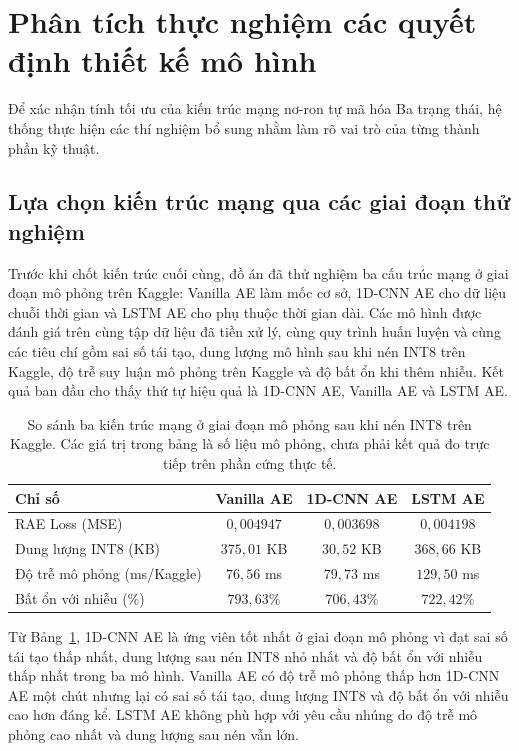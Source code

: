 \section{Phân tích thực nghiệm các quyết định thiết kế mô hình}
\label{sec:thuc_nghiem_thiet_ke}

Để xác nhận tính tối ưu của kiến trúc mạng nơ-ron tự mã hóa Ba trạng thái, hệ thống thực hiện các thí nghiệm bổ sung nhằm làm rõ vai trò của từng thành phần kỹ thuật.

\subsection{Lựa chọn kiến trúc mạng qua các giai đoạn thử nghiệm}

Trước khi chốt kiến trúc cuối cùng, đồ án đã thử nghiệm ba cấu trúc mạng ở giai đoạn mô phỏng trên Kaggle: Vanilla AE làm mốc cơ sở, 1D-CNN AE cho dữ liệu chuỗi thời gian và LSTM AE cho phụ thuộc thời gian dài. Các mô hình được đánh giá trên cùng tập dữ liệu đã tiền xử lý, cùng quy trình huấn luyện và cùng các tiêu chí gồm sai số tái tạo, dung lượng mô hình sau khi nén INT8 trên Kaggle, độ trễ suy luận mô phỏng trên Kaggle và độ bất ổn khi thêm nhiễu. Kết quả ban đầu cho thấy thứ tự hiệu quả là 1D-CNN AE, Vanilla AE và LSTM AE.

\begin{table}[H]
\centering
\caption[So sánh ba kiến trúc mạng sau nén INT8 trên Kaggle]{So sánh ba kiến trúc mạng ở giai đoạn mô phỏng sau khi nén INT8 trên Kaggle. Các giá trị trong bảng là số liệu mô phỏng, chưa phải kết quả đo trực tiếp trên phần cứng thực tế.}
\label{tab:network_architecture_comparison}
\renewcommand{\arraystretch}{1.15}
\begin{tabular}{lccc}
\toprule
\textbf{Chỉ số} & \textbf{Vanilla AE} & \textbf{1D-CNN AE} & \textbf{LSTM AE} \\
\midrule
RAE Loss (MSE) & $0{,}004947$ & \textbf{$0{,}003698$} & $0{,}004198$ \\
Dung lượng INT8 (KB) & $375{,}01$ KB & $30{,}52$ KB & $368{,}66$ KB \\
Độ trễ mô phỏng (ms/Kaggle) & $76{,}56$ ms & $79{,}73$ ms & $129{,}50$ ms \\
Bất ổn với nhiễu (\%) & $793{,}63\%$ & \textbf{$706{,}43\%$} & $722{,}42\%$ \\
\bottomrule
\end{tabular}
\end{table}

Từ Bảng~\ref{tab:network_architecture_comparison}, 1D-CNN AE là ứng viên tốt nhất ở giai đoạn mô phỏng vì đạt sai số tái tạo thấp nhất, dung lượng sau nén INT8 nhỏ nhất và độ bất ổn với nhiễu thấp nhất trong ba mô hình. Vanilla AE có độ trễ mô phỏng thấp hơn 1D-CNN AE một chút nhưng lại có sai số tái tạo, dung lượng INT8 và độ bất ổn với nhiễu cao hơn đáng kể. LSTM AE không phù hợp với yêu cầu nhúng do độ trễ mô phỏng cao nhất và dung lượng sau nén vẫn lớn.

